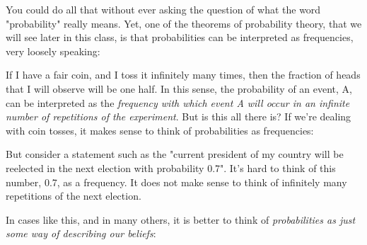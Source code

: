 \documentclass[pdftex, brazil, 12pt, twoside]{article}
\begin{document}
You could do all that without ever asking the question of
what the word "probability" really means.
Yet, one of the theorems of probability theory, that we
will see later in this class, is that probabilities can be
interpreted as frequencies, very loosely speaking:

\begin{figure}[H]
  \begin{center}
  \end{center}
\end{figure}

If I have a fair coin, and I toss it infinitely many times,
then the fraction of heads that I will
observe will be one half.
In this sense, the probability of an event, A, can be
interpreted as the \emph{frequency with which event A will occur
in an infinite number of repetitions of the experiment}.
But is this all there is?
If we're dealing with coin tosses, it makes sense to
think of probabilities as frequencies:

\begin{figure}[H]
  \begin{center}
  \end{center}
\end{figure}

But consider a statement such as the "current president of
my country will be reelected in the next election with
probability 0.7".
It's hard to think of this number, 0.7, as a frequency.
It does not make sense to think of infinitely many
repetitions of the next election.

In cases like this, and in many others, it is better to
think of \emph{probabilities as just some way of
  describing our beliefs}:
\end{document}
